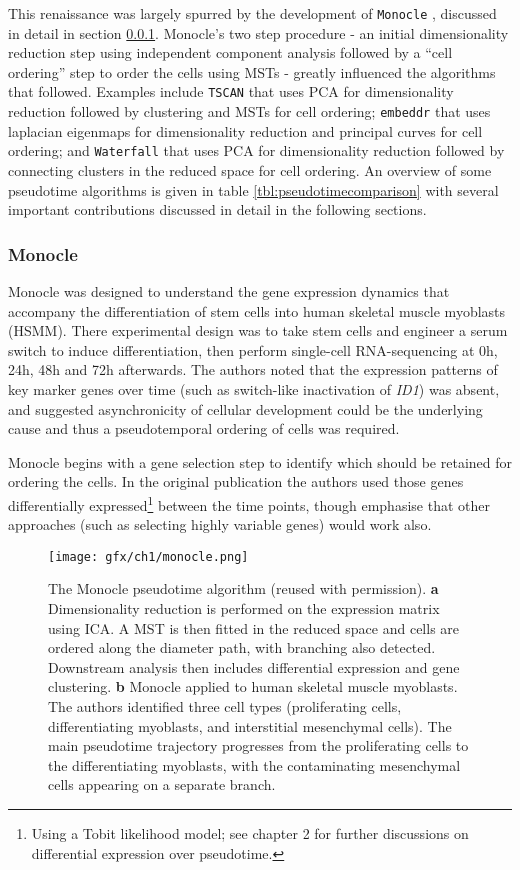 This renaissance was largely spurred by the development of \texttt{Monocle} \cite{Trapnell2014-xi}, discussed in detail in section \ref{tbl:monocle}. Monocle's two step procedure - an initial dimensionality reduction step using independent component analysis followed by a ``cell ordering'' step to order the cells using MSTs - greatly influenced the algorithms that followed. Examples include \texttt{TSCAN} that uses PCA for dimensionality reduction followed by clustering and MSTs for cell ordering; \texttt{embeddr} that uses laplacian eigenmaps for dimensionality reduction and principal curves for cell ordering; and \texttt{Waterfall} that uses PCA for dimensionality reduction followed by connecting clusters in the reduced space for cell ordering. An overview of some pseudotime algorithms is given in table \ref{tbl:pseudotimecomparison} with several important contributions discussed in detail in the following sections.

\subsubsection{Monocle} \label{tbl:monocle}

Monocle was designed to understand the gene expression dynamics that accompany the differentiation of stem cells into human skeletal muscle myoblasts (HSMM). There experimental design was to take stem cells and engineer a serum switch to induce differentiation, then perform single-cell RNA-sequencing at 0h, 24h, 48h and 72h afterwards. The authors noted that the expression patterns of key marker genes over time (such as switch-like inactivation of \emph{ID1}) was absent, and suggested asynchronicity of cellular development could be the underlying cause and thus a pseudotemporal ordering of cells was required.

Monocle begins with a gene selection step to identify which should be retained for ordering the cells. In the original publication the authors used those genes differentially expressed\footnote{
Using a Tobit likelihood model; see chapter 2 for further discussions on differential expression over pseudotime.
} between the time points, though emphasise that other approaches (such as selecting highly variable genes) would work also.

\begin{figure}
\centering
  \texttt{[image: gfx/ch1/monocle.png]}
  \caption[The Monocle pseudotime algorithm.]{The Monocle pseudotime algorithm (reused with permission).
\textbf{a} Dimensionality reduction is performed on the expression matrix using ICA. A MST is then fitted in the reduced space and cells are ordered along the diameter path, with branching also detected. Downstream analysis then includes differential expression and gene clustering.
\textbf{b} Monocle applied to human skeletal muscle myoblasts. The authors identified three cell types (proliferating cells, differentiating myoblasts, and interstitial mesenchymal cells). The main pseudotime trajectory progresses from the proliferating cells to the differentiating myoblasts, with the contaminating mesenchymal cells appearing on a separate branch.
  } \label{fig:monocle}
\end{figure}

